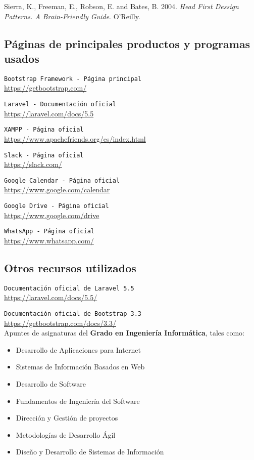 Sierra, K., Freeman, E., Robson, E. and Bates, B. 2004. {\em Head First Dessign Patterns. A Brain-Friendly Guide}. O'Reilly.

\subsection*{Páginas de principales productos y programas usados}

 {\tt Bootstrap Framework - Página principal}\\
\url{https://getbootstrap.com/}

 {\tt Laravel - Documentación oficial}\\
\url{https://laravel.com/docs/5.5}

 {\tt XAMPP - Página oficial}\\
\url{https://www.apachefriends.org/es/index.html}

 {\tt Slack - Página oficial}\\
\url{https://slack.com/}

 {\tt Google Calendar - Página oficial}\\
\url{https://www.google.com/calendar}

 {\tt Google Drive - Página oficial}\\
\url{https://www.google.com/drive}

 {\tt WhatsApp - Página oficial}\\
\url{https://www.whatsapp.com/}

\subsection*{Otros recursos utilizados}

 {\tt Documentación oficial de Laravel 5.5}\\
\url{https://laravel.com/docs/5.5/}

 {\tt Documentación oficial de Bootstrap 3.3}\\
\url{https://getbootstrap.com/docs/3.3/}\\

Apuntes de asignaturas del \textbf{Grado en Ingeniería Informática}, tales como:
\begin{itemize}
    \item Desarrollo de Aplicaciones para Internet
    \item Sistemas de Información Basados en Web
    \item Desarrollo de Software
    \item Fundamentos de Ingeniería del Software
    \item Dirección y Gestión de proyectos
    \item Metodologías de Desarrollo Ágil
    \item Diseño y Desarrollo de Sistemas de Información
\end{itemize}

